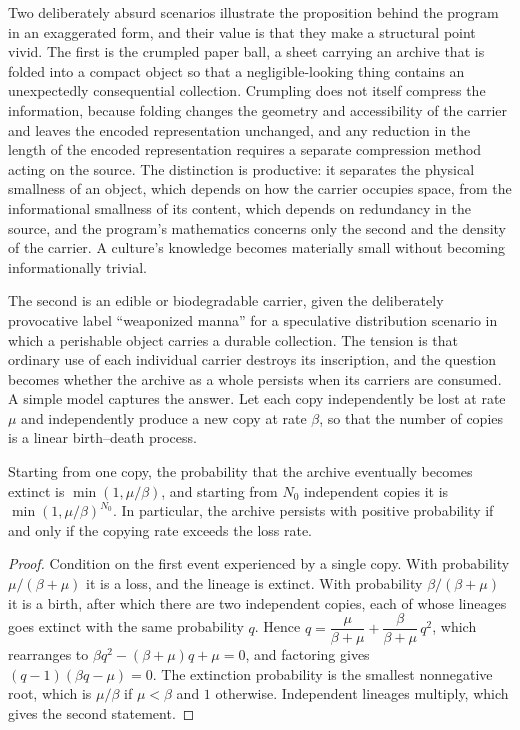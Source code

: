 Two deliberately absurd scenarios illustrate the proposition behind the program in an exaggerated form, and their value is that they make a structural point vivid. The first is the crumpled paper ball, a sheet carrying an archive that is folded into a compact object so that a negligible-looking thing contains an unexpectedly consequential collection. Crumpling does not itself compress the information, because folding changes the geometry and accessibility of the carrier and leaves the encoded representation unchanged, and any reduction in the length of the encoded representation requires a separate compression method acting on the source. The distinction is productive: it separates the physical smallness of an object, which depends on how the carrier occupies space, from the informational smallness of its content, which depends on redundancy in the source, and the program's mathematics concerns only the second and the density of the carrier. A culture's knowledge becomes materially small without becoming informationally trivial.

The second is an edible or biodegradable carrier, given the deliberately provocative label ``weaponized manna'' for a speculative distribution scenario in which a perishable object carries a durable collection. The tension is that ordinary use of each individual carrier destroys its inscription, and the question becomes whether the archive as a whole persists when its carriers are consumed. A simple model captures the answer. Let each copy independently be lost at rate $\mu$ and independently produce a new copy at rate $\beta$, so that the number of copies is a linear birth--death process.

\begin{proposition}\label{prop:birthdeath}
Starting from one copy, the probability that the archive eventually becomes extinct is $\min(1,\mu/\beta)$, and starting from $N_0$ independent copies it is $\min(1,\mu/\beta)^{N_0}$. In particular, the archive persists with positive probability if and only if the copying rate exceeds the loss rate.
\end{proposition}

\begin{proof}
Condition on the first event experienced by a single copy. With probability $\mu/(\beta+\mu)$ it is a loss, and the lineage is extinct. With probability $\beta/(\beta+\mu)$ it is a birth, after which there are two independent copies, each of whose lineages goes extinct with the same probability $q$. Hence $q=\dfrac{\mu}{\beta+\mu}+\dfrac{\beta}{\beta+\mu}\,q^{2}$, which rearranges to $\beta q^{2}-(\beta+\mu)q+\mu=0$, and factoring gives $(q-1)(\beta q-\mu)=0$. The extinction probability is the smallest nonnegative root, which is $\mu/\beta$ if $\mu<\beta$ and $1$ otherwise. Independent lineages multiply, which gives the second statement.
\end{proof}

